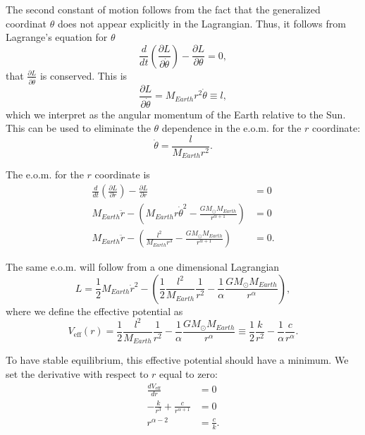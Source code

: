 \documentclass[%
 reprint,
nofootinbib,
aps,
]{revtex4-1}
\begin{document}
The second constant of motion follows from the fact that the generalized coordinat $\theta$ does not appear explicitly in the Lagrangian. Thus, it follows from Lagrange's equation for $\theta$
\begin{equation}
\frac{d}{dt}\left(\frac{\partial L}{\partial \dot{\theta}}\right) - \frac{\partial L}{\partial \theta} = 0,
\end{equation}
that $\frac{\partial L}{\partial \dot{\theta}}$ is conserved. This is
\begin{equation}
\frac{\partial L}{\partial \dot{\theta}} = M_{Earth}r^2\dot{\theta} \equiv l,
\end{equation}
which we interpret as the angular momentum of the Earth relative to the Sun. This can be used to eliminate the $\theta$ dependence in the e.o.m. for the $r$ coordinate:
\begin{equation}
\dot{\theta} = \frac{l}{M_{Earth}r^2}.
\end{equation}

The e.o.m. for the $r$ coordinate is
\begin{align}
\frac{d}{dt}\left(\frac{\partial L}{\partial \dot{r}}\right) - \frac{\partial L}{\partial r} &= 0\\
M_{Earth}\ddot{r} - \left(M_{Earth}r\dot{\theta}^2 - \frac{GM_\odot M_{Earth}}{r^{\alpha + 1}}\right) &= 0\\
M_{Earth}\ddot{r} - \left(\frac{l^2}{M_{Earth}r^3} - \frac{GM_\odot M_{Earth}}{r^{\alpha + 1}}\right) &= 0.
\end{align}

The same e.o.m. will follow from a one dimensional Lagrangian
\begin{equation}
L = \frac{1}{2}M_{Earth}\dot{r}^2 - \left(\frac{1}{2}\frac{l^2}{M_{Earth}}\frac{1}{r^2} - \frac{1}{\alpha}\frac{GM_\odot M_{Earth}}{r^{\alpha}}\right),
\end{equation}
where we define the effective potential as
\begin{equation}
V_{\mathrm{eff}}(r) = \frac{1}{2}\frac{l^2}{M_{Earth}}\frac{1}{r^2} - \frac{1}{\alpha}\frac{GM_\odot M_{Earth}}{r^{\alpha}} \equiv \frac{1}{2}\frac{k}{r^2} - \frac{1}{\alpha}\frac{c}{r^{\alpha}}.
\end{equation}

To have stable equilibrium, this effective potential should have a minimum. We set the derivative with respect to $r$ equal to zero:
\begin{align}
\frac{dV_{\mathrm{eff}}}{dr} &= 0\\
-\frac{k}{r^3} + \frac{c}{r^{\alpha + 1}} &= 0\\
r^{\alpha - 2} &= \frac{c}{k}.\label{eq: stationary}
\end{align}
\end{document}
